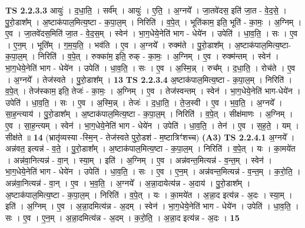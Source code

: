 \documentclass[17pt]{extarticle}
\begin{document}
                  \newline
                                \textbf{ TS 2.2.3.3} \newline
                  आयुः॑ । द॒धा॒ति॒ । सर्व᳚म् । आयुः॑ । ए॒ति॒ । अ॒ग्नये᳚ । जा॒तवे॑दस॒ इति॑ जा॒त - वे॒द॒से॒ । पु॒रो॒डाश᳚म् । अ॒ष्टाक॑पाल॒मित्य॒ष्टा - क॒पा॒ल॒म् । निरिति॑ । व॒पे॒त् । भूति॑काम॒ इति॒ भूति॑ - का॒मः॒ । अ॒ग्निम् । ए॒व । जा॒तवे॑दस॒मिति॑ जा॒त - वे॒द॒स॒म् । स्वेन॑ । भा॒ग॒धेये॒नेति॑ भाग - धेये॑न । उपेति॑ । धा॒व॒ति॒ । सः । ए॒व । ए॒न॒म् । भूति᳚म् । ग॒म॒य॒ति॒ । भव॑ति । ए॒व । अ॒ग्नये᳚ । रुक्म॑ते । पु॒रो॒डाश᳚म् । अ॒ष्टाक॑पाल॒मित्य॒ष्टा-क॒पा॒ल॒म् । निरिति॑ । व॒पे॒त् । रुक्का॑म॒ इति॒ रुक् - का॒मः॒ । अ॒ग्निम् । ए॒व । रुक्म॑न्तम् । स्वेन॑ । भा॒ग॒धेये॒नेति॑ भाग - धेये॑न । उपेति॑ । धा॒व॒ति॒ । सः । ए॒व । अ॒स्मि॒न्न् । रुच᳚म् । द॒धा॒ति॒ । रोच॑ते । ए॒व । अ॒ग्नये᳚ । तेज॑स्वते । पु॒रो॒डाश᳚म् । \textbf{  13} \newline
                  \newline
                                \textbf{ TS 2.2.3.4} \newline
                  अ॒ष्टाक॑पाल॒मित्य॒ष्टा - क॒पा॒ल॒म् । निरिति॑ । व॒पे॒त् । तेज॑स्काम॒ इति॒ तेजः॑ - का॒मः॒ । अ॒ग्निम् । ए॒व । तेज॑स्वन्तम् । स्वेन॑ । भा॒ग॒धेये॒नेति॑ भाग-धेये॑न । उपेति॑ । धा॒व॒ति॒ । सः । ए॒व । अ॒स्मि॒न्न् । तेजः॑ । द॒धा॒ति॒ । ते॒ज॒स्वी । ए॒व । भ॒व॒ति॒ । अ॒ग्नये᳚ । सा॒ह॒न्त्याय॑ । पु॒रो॒डाश᳚म् । अ॒ष्टाक॑पाल॒मित्य॒ष्टा - क॒पा॒ल॒म् । निरिति॑ । व॒पे॒त् । सीक्ष॑माणः । अ॒ग्निम् । ए॒व । सा॒ह॒न्त्यम् । स्वेन॑ । भा॒ग॒धेये॒नेति॑ भाग - धेये॑न । उपेति॑ । धा॒व॒ति॒ । तेन॑ । ए॒व । स॒ह॒ते॒ । यम् । सीक्ष॑ते ॥ \textbf{  14 } \newline
                  \newline
                      (भ्रातृ॑व्यस्या -स्मि॒न् - तेज॑स्वते पुरो॒डश॑ - म॒ष्टात्रिꣳ॑शच्च)  \textbf{(A3)} \newline \newline
                                \textbf{ TS 2.2.4.1} \newline
                  अ॒ग्नये᳚ । अन्न॑वत॒ इत्यन्न॑ - व॒ते॒ । पु॒रो॒डाश᳚म् । अ॒ष्टाक॑पाल॒मित्य॒ष्टा - क॒पा॒ल॒म् । निरिति॑ । व॒पे॒त् । यः । का॒मये॑त । अन्न॑वा॒नित्यन्न॑ - वा॒न् । स्या॒म् । इति॑ । अ॒ग्निम् । ए॒व । अन्न॑वन्त॒मित्यन्न॑ - व॒न्त॒म् । स्वेन॑ । भा॒ग॒धेये॒नेति॑ भाग - धेये॑न । उपेति॑ । धा॒व॒ति॒ । सः । ए॒व । ए॒न॒म् । अन्न॑वन्त॒मित्यन्न॑ - व॒न्त॒म् । क॒रो॒ति॒ । अन्न॑वा॒नित्यन्न॑ - वा॒न् । ए॒व । भ॒व॒ति॒ । अ॒ग्नये᳚ । अ॒न्ना॒दायेत्य॑न्न - अ॒दाय॑ । पु॒रो॒डाश᳚म् । अ॒ष्टाक॑पाल॒मित्य॒ष्टा - क॒पा॒ल॒म् । निरिति॑ । व॒पे॒त् । यः । का॒मये॑त । अ॒न्ना॒द इत्य॑न्न - अ॒दः । स्या॒म् । इति॑ । अ॒ग्निम् । ए॒व । अ॒न्ना॒दमित्य॑न्न - अ॒दम् । स्वेन॑ । भा॒ग॒धेये॒नेति॑ भाग - धेये॑न । उपेति॑ । धा॒व॒ति॒ । सः । ए॒व । ए॒न॒म् । अ॒न्ना॒दमित्य॑न्न - अ॒दम् । क॒रो॒ति॒ । अ॒न्ना॒द इत्य॑न्न - अ॒दः । \textbf{  15} \newline
\end{document}
